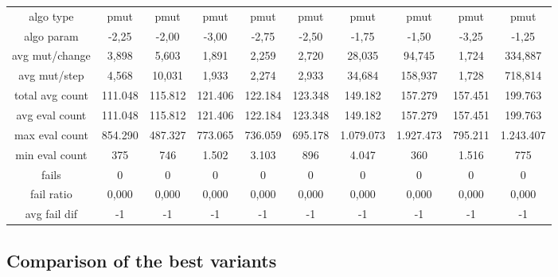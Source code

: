 \begin{tabular}[h]{cccccccccc}
algo type&             pmut&      pmut&      pmut&      pmut&      pmut&      pmut&      pmut&      pmut&      pmut\\
algo param&           -2,25&     -2,00&     -3,00&     -2,75&     -2,50&     -1,75&     -1,50&     -3,25&     -1,25\\
avg mut/change&       3,898&     5,603&     1,891&     2,259&     2,720&    28,035&    94,745&     1,724&   334,887\\
avg mut/step&         4,568&    10,031&     1,933&     2,274&     2,933&    34,684&   158,937&     1,728&   718,814\\
\hline
total avg count&    111.048&   115.812&   121.406&   122.184&   123.348&   149.182&   157.279&   157.451&   199.763\\
avg eval count&     111.048&   115.812&   121.406&   122.184&   123.348&   149.182&   157.279&   157.451&   199.763\\
max eval count&     854.290&   487.327&   773.065&   736.059&   695.178& 1.079.073& 1.927.473&   795.211& 1.243.407\\
min eval count&         375&       746&     1.502&     3.103&       896&     4.047&       360&     1.516&       775\\
\hline
fails&                    0&         0&         0&         0&         0&         0&         0&         0&         0\\
fail ratio&           0,000&     0,000&     0,000&     0,000&     0,000&     0,000&     0,000&     0,000&     0,000\\
avg fail dif&            -1&        -1&        -1&        -1&        -1&        -1&        -1&        -1&        -1\\
\end{tabular}


\subsection{Comparison of the best variants}


